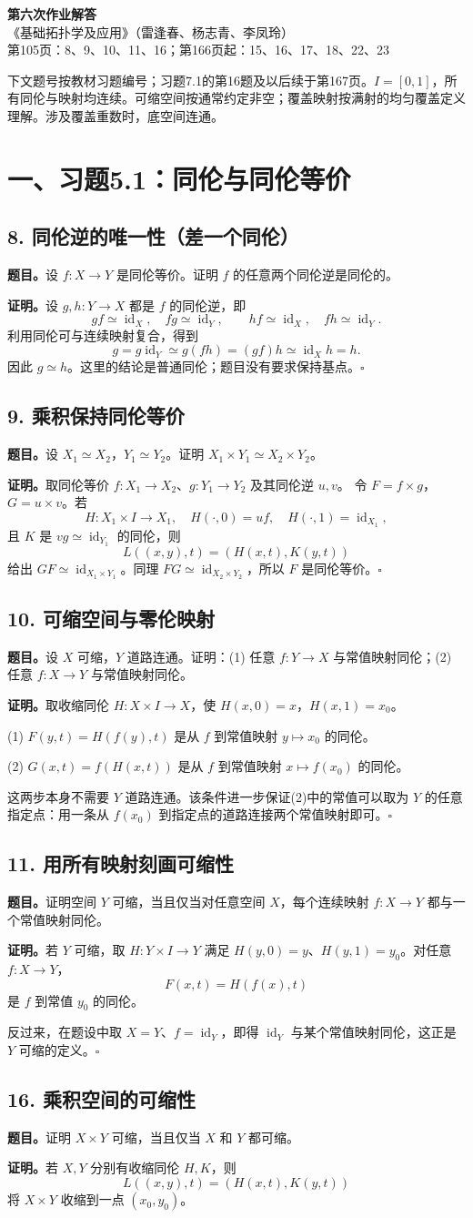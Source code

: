 \documentclass[UTF8,11pt,a4paper]{ctexart}
\newcommand{\id}{\operatorname{id}}\newcommand{\pf}{\par\noindent\textbf{证明。}}
\newcommand{\problem}[2]{\subsection*{#1}\noindent\textbf{题目。}#2\par}
\begin{document}
\begin{center}{\LARGE\bfseries 第六次作业解答}\\[5pt]
《基础拓扑学及应用》（雷逢春、杨志青、李凤玲）\\[3pt]
第105页：8、9、10、11、16；第166页起：15、16、17、18、22、23
\end{center}
\noindent 下文题号按教材习题编号；习题7.1的第16题及以后续于第167页。$I=[0,1]$，所有同伦与映射均连续。可缩空间按通常约定非空；覆盖映射按满射的均匀覆盖定义理解。涉及覆盖重数时，底空间连通。
\section*{一、习题5.1：同伦与同伦等价}
\problem{8. 同伦逆的唯一性（差一个同伦）}{设 $f:X\to Y$ 是同伦等价。证明 $f$ 的任意两个同伦逆是同伦的。}
\pf 设 $g,h:Y\to X$ 都是 $f$ 的同伦逆，即
\[gf\simeq\id_X,\quad fg\simeq\id_Y,\qquad hf\simeq\id_X,\quad fh\simeq\id_Y.\]
利用同伦可与连续映射复合，得到
\[g=g\id_Y\simeq g(fh)=(gf)h\simeq\id_Xh=h.\]
因此 $g\simeq h$。这里的结论是普通同伦；题目没有要求保持基点。\hfill$\square$
\problem{9. 乘积保持同伦等价}{设 $X_1\simeq X_2$，$Y_1\simeq Y_2$。证明 $X_1\times Y_1\simeq X_2\times Y_2$。}
\pf 取同伦等价 $f:X_1\to X_2$、$g:Y_1\to Y_2$ 及其同伦逆 $u,v$。
令 $F=f\times g$，$G=u\times v$。若
\[H:X_1\times I\to X_1,\quad H(\cdot,0)=uf,\quad H(\cdot,1)=\id_{X_1},\]
且 $K$ 是 $vg\simeq\id_{Y_1}$ 的同伦，则
\[L((x,y),t)=(H(x,t),K(y,t))\]
给出 $GF\simeq\id_{X_1\times Y_1}$。同理 $FG\simeq\id_{X_2\times Y_2}$，所以 $F$ 是同伦等价。\hfill$\square$
\problem{10. 可缩空间与零伦映射}{设 $X$ 可缩，$Y$ 道路连通。证明：(1) 任意 $f:Y\to X$ 与常值映射同伦；(2) 任意 $f:X\to Y$ 与常值映射同伦。}
\pf 取收缩同伦 $H:X\times I\to X$，使 $H(x,0)=x$，$H(x,1)=x_0$。

(1) $F(y,t)=H(f(y),t)$ 是从 $f$ 到常值映射 $y\mapsto x_0$ 的同伦。

(2) $G(x,t)=f(H(x,t))$ 是从 $f$ 到常值映射 $x\mapsto f(x_0)$ 的同伦。

这两步本身不需要 $Y$ 道路连通。该条件进一步保证(2)中的常值可以取为 $Y$ 的任意指定点：用一条从 $f(x_0)$ 到指定点的道路连接两个常值映射即可。\hfill$\square$
\newpage
\problem{11. 用所有映射刻画可缩性}{证明空间 $Y$ 可缩，当且仅当对任意空间 $X$，每个连续映射 $f:X\to Y$ 都与一个常值映射同伦。}
\pf 若 $Y$ 可缩，取 $H:Y\times I\to Y$ 满足 $H(y,0)=y$、$H(y,1)=y_0$。对任意 $f:X\to Y$，
\[F(x,t)=H(f(x),t)\]
是 $f$ 到常值 $y_0$ 的同伦。

反过来，在题设中取 $X=Y$、$f=\id_Y$，即得 $\id_Y$ 与某个常值映射同伦，这正是 $Y$ 可缩的定义。\hfill$\square$
\problem{16. 乘积空间的可缩性}{证明 $X\times Y$ 可缩，当且仅当 $X$ 和 $Y$ 都可缩。}
\pf 若 $X,Y$ 分别有收缩同伦 $H,K$，则
\[L((x,y),t)=(H(x,t),K(y,t))\]
将 $X\times Y$ 收缩到一点 $(x_0,y_0)$。
\end{document}
